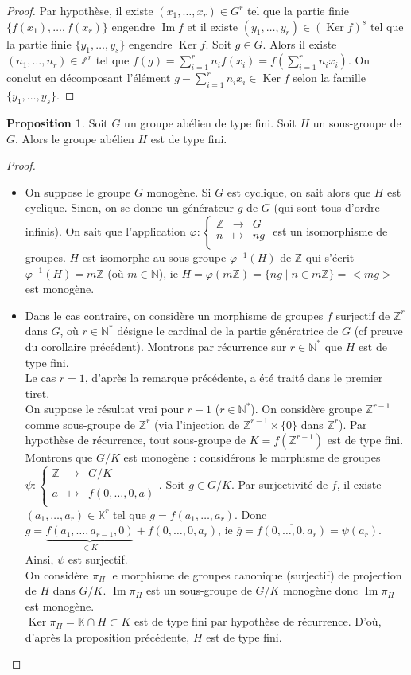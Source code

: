 \documentclass{article}
\newcommand{\Z}{\mathbb{Z}}
\newcommand{\K}{\mathbb{K}}
\newcommand{\N}{\mathbb{N}}
\newcommand{\im}{\mathop{\mathrm{Im}}\nolimits}
\renewcommand{\ker}{\mathop{\mathrm{Ker}}\nolimits}
\newcommand{\dis}{\displaystyle}
\theoremstyle{definition}
\newtheorem{prop}{Proposition}
\theoremstyle{remark}
\newcommand{\app}[5]{#1:\left\{\begin{array}{rcl}
#2 & \longrightarrow & #3 \\
#4 & \longmapsto & #5  \\
\end{array}\right.
}
\begin{document}
\begin{proof}
Par hypothèse, il existe $(x_1, \ldots, x_r) \in G^r$ tel que la partie finie $\{f(x_1), \ldots, f(x_r) \}$ engendre $\im f$ et il existe $(y_1, \ldots, y_r) \in (\ker f)^s$ tel que la partie finie $\{y_1, \ldots, y_s \}$ engendre $\ker f$. Soit $g \in G$. Alors il existe $(n_1, \ldots, n_r) \in \Z^r$ tel que $f(g)=\dis \sum_{i=1}^r n_if(x_i)=f\left(\sum_{i=1}^r n_ix_i\right)$. On conclut en décomposant l'élément $g-\dis \sum_{i=1}^r n_ix_i\in \ker f$ selon la famille $\{y_1, \ldots, y_s\}$.
\end{proof}



\begin{prop}
Soit $G$ un groupe abélien de type fini. Soit $H$ un sous-groupe de $G$. Alors le groupe abélien $H$ est de type fini.
\end{prop}

\begin{proof} \
\begin{itemize}
\item On suppose le groupe $G$ monogène. Si $G$ est cyclique, on sait alors que $H$ est cyclique. Sinon, on se donne un générateur $g$ de $G$ (qui sont tous d'ordre infinis). On sait que l'application $\app{\varphi}{\Z}{G}{n}{ng}$ est un isomorphisme de groupes. $H$ est isomorphe au sous-groupe $\varphi^{-1}(H)$ de $\Z$ qui s'écrit $\varphi^{-1}(H)=m\Z$ (où $m \in \N$), ie $H=\varphi(m\Z)=\{ng \mid n \in m\Z \}=<mg>$ est monogène. 
\item Dans le cas contraire, on considère un morphisme de groupes $f$ surjectif de $\Z^r$ dans $G$, où $r \in \N^*$ désigne le cardinal de la partie génératrice de $G$ (cf preuve du corollaire précédent). Montrons par récurrence sur $r \in \N^*$ que $H$ est de type fini. \\
Le cas $r=1$, d'après la remarque précédente, a été traité dans le premier tiret. \\
On suppose le résultat vrai pour $r-1$ ($r \in \N^*$). On considère groupe $\Z^{r-1}$ comme sous-groupe de $\Z^r$ (via l'injection de $\Z^{r-1} \times \{0\}$ dans $\Z^{r}$). Par hypothèse de récurrence, tout sous-groupe de $K=f(\Z^{r-1})$ est de type fini. Montrons que $G/K$ est monogène : considérons le morphisme de groupes $\app{\psi}{\Z}{G/K}{a}{\overline{f(0, \ldots, 0,a)}}$. 
Soit $\overline{g} \in G/K$. Par surjectivité de $f$, il existe $(a_1, \ldots, a_r) \in \K^r$ tel que $g=f(a_1, \ldots, a_r)$. Donc $g=\underbrace{f(a_1, \ldots, a_{r-1},0)}_{\in K}+f(0, \ldots, 0, a_r)$, ie $\overline{g}=\overline{f(0, \ldots, 0,a_r)}=\psi(a_r)$. Ainsi, $\psi$ est surjectif. \\
On considère $\pi_H$ le morphisme de groupes canonique (surjectif) de projection de $H$ dans $G/K$. $\im \pi_H$ est un sous-groupe de $G/K$ monogène donc $\im \pi_H$ est monogène. \\
$\ker \pi_H=\K \cap H \subset K$ est de type fini par hypothèse de récurrence. D'où, d'après la proposition précédente, $H$ est de type fini.
\end{itemize}
\end{proof}
\end{document}
